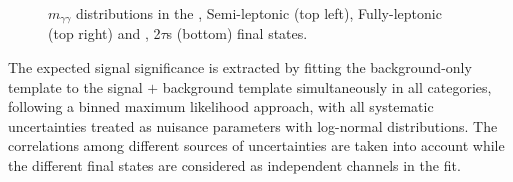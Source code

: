 \begin{figure}[!htbp]
    \setcounter{subfigure}{0}
    \centering
    \qquad
    \qquad
    \caption{$m_{\gamma\gamma}$ distributions in the \wwgg, Semi-leptonic (top left), Fully-leptonic (top right) and \ttgg, 2$\tau$s (bottom) final states.}
    \label{fig:final_plots}
\end{figure}

The expected signal significance is extracted by fitting the background-only \mgg template to the signal $+$ background template simultaneously in all categories, following a binned maximum likelihood
approach, with all systematic uncertainties treated as nuisance parameters with log-normal distributions. The correlations among different sources of uncertainties are taken into account while the different final states are considered as independent channels in the fit. 

